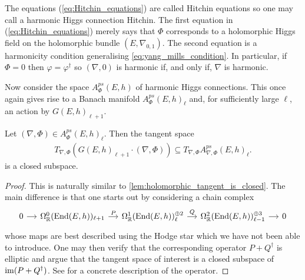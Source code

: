 \documentclass[12pt]{ociamthesis}  %
\begin{document}
The equations (\ref{eq:Hitchin_equations}) are called Hitchin equations
so one may call a harmonic Higgs connection Hitchin. The first equation
in (\ref{eq:Hitchin_equations}) merely says that $\Phi$
corresponds to a holomorphic Higgs field on the holomorphic bundle
$(E,\nabla_{0,1})$.  The second equation is a harmonicity condition generalising
\ref{eq:yang_mills_condition}. In particular, if $\Phi = 0$ then $\varphi =
  \varphi^\dagger$ so $(\nabla,0)$ is harmonic if, and only if, $\nabla$ is
harmonic.

Now consider the space $A_\Phi^{ps}(E,h)$ of harmonic Higgs connections.
This once again gives rise to a Banach manifold $A_\Phi^{ps}(E,h)_\ell$
and, for sufficiently large $\ell$, an action by $G(E,h)_{\ell+1}$.

\begin{lemma}
  Let $(\nabla,\Phi)\in A_\Phi^{ps}(E,h)_\ell$. Then the tangent space
  \begin{align*}
    T_{\nabla,\Phi}(G(E,h)_{\ell+1}\cdot(\nabla,\Phi))
    \subseteq T_{\nabla,\Phi}A_{\nabla,\Phi}^{ps}(E,h)_\ell.
  \end{align*}
  is a closed subspace.
  \begin{proof}
    This is naturally similar to \ref{lem:holomorphic_tangent_is_closed}.
    The main difference is that one starts out by considering a chain
    complex
    \begin{equation*}
      \begin{tikzcd}[column sep=small]
        0 & {\Omega^0_{\mathbb R}(\End(E,h))_{\ell+1}} & {\Omega^1_{\mathbb R}(\End(E,h))^{\oplus 2}_\ell} & {\Omega^2_{\mathbb R}(\End(E,h))^{\oplus 3}_{\ell-1}} & 0
        \arrow[from=1-1, to=1-2]
        \arrow["P", from=1-2, to=1-3]
        \arrow["Q", from=1-3, to=1-4]
        \arrow[from=1-4, to=1-5]
      \end{tikzcd}
    \end{equation*}
    whose maps are best described using the Hodge star which we have
    not been able to introduce. One may then
    verify that the corresponding operator $P+Q^\dagger$ is elliptic
    and argue that the tangent space of interest is a closed subspace
    of $\operatorname{im}(P+Q^\dagger)$. See \cite[98]{neitzke2021} for a concrete
    description of the operator.
  \end{proof}
\end{lemma}
\end{document}
